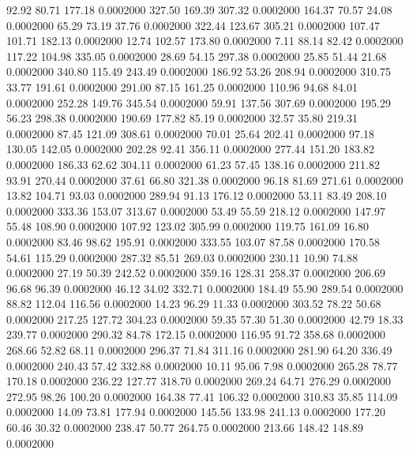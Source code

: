   92.92   80.71  177.18   0.0002000
 327.50  169.39  307.32   0.0002000
 164.37   70.57   24.08   0.0002000
  65.29   73.19   37.76   0.0002000
 322.44  123.67  305.21   0.0002000
 107.47  101.71  182.13   0.0002000
  12.74  102.57  173.80   0.0002000
   7.11   88.14   82.42   0.0002000
 117.22  104.98  335.05   0.0002000
  28.69   54.15  297.38   0.0002000
  25.85   51.44   21.68   0.0002000
 340.80  115.49  243.49   0.0002000
 186.92   53.26  208.94   0.0002000
 310.75   33.77  191.61   0.0002000
 291.00   87.15  161.25   0.0002000
 110.96   94.68   84.01   0.0002000
 252.28  149.76  345.54   0.0002000
  59.91  137.56  307.69   0.0002000
 195.29   56.23  298.38   0.0002000
 190.69  177.82   85.19   0.0002000
  32.57   35.80  219.31   0.0002000
  87.45  121.09  308.61   0.0002000
  70.01   25.64  202.41   0.0002000
  97.18  130.05  142.05   0.0002000
 202.28   92.41  356.11   0.0002000
 277.44  151.20  183.82   0.0002000
 186.33   62.62  304.11   0.0002000
  61.23   57.45  138.16   0.0002000
 211.82   93.91  270.44   0.0002000
  37.61   66.80  321.38   0.0002000
  96.18   81.69  271.61   0.0002000
  13.82  104.71   93.03   0.0002000
 289.94   91.13  176.12   0.0002000
  53.11   83.49  208.10   0.0002000
 333.36  153.07  313.67   0.0002000
  53.49   55.59  218.12   0.0002000
 147.97   55.48  108.90   0.0002000
 107.92  123.02  305.99   0.0002000
 119.75  161.09   16.80   0.0002000
  83.46   98.62  195.91   0.0002000
 333.55  103.07   87.58   0.0002000
 170.58   54.61  115.29   0.0002000
 287.32   85.51  269.03   0.0002000
 230.11   10.90   74.88   0.0002000
  27.19   50.39  242.52   0.0002000
 359.16  128.31  258.37   0.0002000
 206.69   96.68   96.39   0.0002000
  46.12   34.02  332.71   0.0002000
 184.49   55.90  289.54   0.0002000
  88.82  112.04  116.56   0.0002000
  14.23   96.29   11.33   0.0002000
 303.52   78.22   50.68   0.0002000
 217.25  127.72  304.23   0.0002000
  59.35   57.30   51.30   0.0002000
  42.79   18.33  239.77   0.0002000
 290.32   84.78  172.15   0.0002000
 116.95   91.72  358.68   0.0002000
 268.66   52.82   68.11   0.0002000
 296.37   71.84  311.16   0.0002000
 281.90   64.20  336.49   0.0002000
 240.43   57.42  332.88   0.0002000
  10.11   95.06    7.98   0.0002000
 265.28   78.77  170.18   0.0002000
 236.22  127.77  318.70   0.0002000
 269.24   64.71  276.29   0.0002000
 272.95   98.26  100.20   0.0002000
 164.38   77.41  106.32   0.0002000
 310.83   35.85  114.09   0.0002000
  14.09   73.81  177.94   0.0002000
 145.56  133.98  241.13   0.0002000
 177.20   60.46   30.32   0.0002000
 238.47   50.77  264.75   0.0002000
 213.66  148.42  148.89   0.0002000
